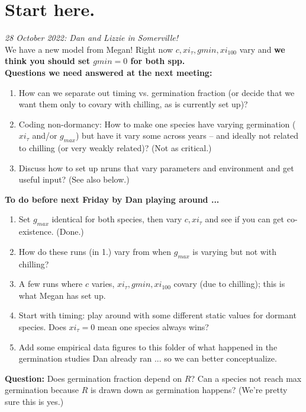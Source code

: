 \documentclass[11pt,letter]{article}
\begin{document}
\section{Start here.} 

\emph{28 October 2022: Dan and Lizzie in Somerville!}\\

We have a new model from Megan! Right now $c, xi_{\tau}, gmin, xi_{100}$ vary and {\bf we think you should set $gmin=0$ for both spp.}\\

{\bf Questions we need answered at the next meeting:}
\begin{enumerate}
\item How can we separate out timing vs. germination fraction (or decide that we want them only to covary with chilling, as is currently set up)? 
\item Coding non-dormancy: How to make one species have varying germination ($xi_{\tau}$ and/or $g_{max}$) but have it vary some across years -- and ideally not related to chilling (or very weakly related)? (Not as critical.)
\item Discuss how to set up nruns that vary parameters and environment and get useful input? (See also below.)
\end{enumerate}

{\bf To do before next Friday by Dan playing around ... }
\begin{enumerate}
\item Set $g_{max}$ identical for both species, then vary $c, xi_{\tau}$ and see if you can get co-existence. (Done.)
\item How do these runs (in 1.) vary from when $g_{max}$ is varying but not with chilling?
\item A few runs where $c$ varies, $xi_{\tau}, gmin, xi_{100}$ covary (due to chilling); this is what Megan has set up.
\item Start with timing: play around with some different static values for dormant species. Does $xi_{\tau}=0$ mean one species always wins? 
\item Add some empirical data figures to this folder of what happened in the germination studies Dan already ran ... so we can better conceptualize. 
\end{enumerate}
{\bf Question:} Does germination fraction depend on $R$? Can a species not reach max germination because $R$ is drawn down as germination happens? (We're pretty sure this is yes.)  \\
\end{document}

